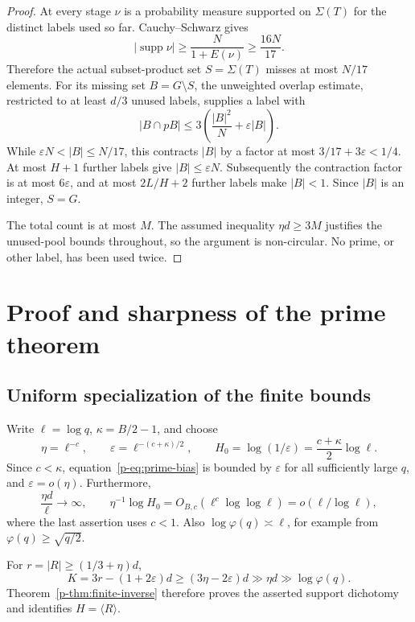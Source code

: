 \documentclass[11pt,a4paper]{article}
\theoremstyle{definition}
\theoremstyle{remark}
\begin{document}
\begin{proof}
At every stage $\nu$ is a probability measure supported on
$\Sigma(T)$ for the distinct labels used so far. Cauchy--Schwarz gives
\[
 |\operatorname{supp}\nu|\geq\frac N{1+E(\nu)}\geq\frac{16N}{17}.
\]
Therefore the actual subset-product set $S=\Sigma(T)$ misses at most
$N/17$ elements. For its missing set $B=G\setminus S$, the unweighted
overlap estimate, restricted to at least $d/3$ unused labels, supplies
a label with
\[
 |B\cap pB|\leq3\left(\frac{|B|^2}{N}+\varepsilon|B|\right).
\]
While $\varepsilon N<|B|\leq N/17$, this contracts $|B|$ by a factor
at most $3/17+3\varepsilon<1/4$. At most $H+1$ further labels give
$|B|\leq\varepsilon N$. Subsequently the contraction factor is at most
$6\varepsilon$, and at most $2L/H+2$ further labels make $|B|<1$.
Since $|B|$ is an integer, $S=G$.

The total count is at most $M$. The assumed inequality
$\eta d\geq3M$ justifies the unused-pool bounds throughout, so the
argument is non-circular. No prime, or other label, has been used twice.
\end{proof}




\section{Proof and sharpness of the prime theorem}
\subsection{Uniform specialization of the finite bounds}
Write $\ell=\log q$, $\kappa=B/2-1$, and choose
\begin{equation}\label{p-eq:parameters}
 \eta=\ell^{-c},\qquad
 \varepsilon=\ell^{-(c+\kappa)/2},\qquad
 H_0=\log(1/\varepsilon)=\frac{c+\kappa}{2}\log\ell.
\end{equation}
Since $c<\kappa$, equation~\eqref{p-eq:prime-bias} is bounded by
$\varepsilon$ for all sufficiently large $q$, and
$\varepsilon=o(\eta)$. Furthermore,
\[
 \frac{\eta d}{\ell}\longrightarrow\infty,\qquad
 \eta^{-1}\log H_0=O_{B,c}(\ell^c\log\log\ell)
       =o(\ell/\log\ell),
\]
where the last assertion uses $c<1$. Also
$\log\varphi(q)\asymp\ell$, for example from
$\varphi(q)\ge\sqrt{q/2}$.

For $r=|R|\ge(1/3+\eta)d$,
\[
 K=3r-(1+2\varepsilon)d\ge(3\eta-2\varepsilon)d
       \gg\eta d\gg\log\varphi(q).
\]
Theorem~\ref{p-thm:finite-inverse} therefore proves the asserted support
dichotomy and identifies $H=\langle R\rangle$.
\end{document}
